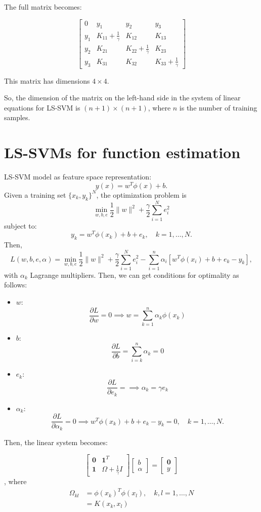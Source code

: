 The full matrix becomes:

\[
\begin{bmatrix}
0 & y_1 & y_2 & y_3 \\
y_1 & K_{11} + \frac{1}{\gamma} & K_{12} & K_{13} \\
y_2 & K_{21} & K_{22} + \frac{1}{\gamma} & K_{23} \\
y_3 & K_{31} & K_{32} & K_{33} + \frac{1}{\gamma}
\end{bmatrix}
\]

This matrix has dimensions \( 4 \times 4 \).

So, the dimension of the matrix on the left-hand side in the system of linear equations for LS-SVM is \( (n + 1) \times (n + 1) \), where \( n \) is the number of training samples.

\section{LS-SVMs for function estimation}
LS-SVM model as feature space representation:
$$y(x) = w^T\phi(x)+b.$$
Given a training set $\{x_k, y_k\}^N$, the optimization problem is 
\[
\min_{w, b, e} \frac{1}{2} \|w\|^2 + \frac{\gamma}{2} \sum_{i=1}^N e_i^2
\]
subject to:
\[
y_k = w^T \phi(x_k) + b + e_k, \quad k = 1,\dots, N. \]
Then, 
\[
L(w, b, e, \alpha) = \min_{w, b, e} \frac{1}{2} \|w\|^2 + \frac{\gamma}{2} \sum_{i=1}^N e_i^2 - \sum_{i=1}^n \alpha_i \left[ w^T \phi(x_i) + b + e_k - y_k \right],
\]
with $\alpha_k$ Lagrange multipliers. Then, we can get conditions for optimality as follows:

\begin{itemize}
	\item \( w \): \[
   \frac{\partial L}{\partial w} = 0 \implies w = \sum_{k=1}^n \alpha_k \phi(x_k)
   \]
	\item \( b \):
   \[
   \frac{\partial L}{\partial b} = \sum_{i=k}^n \alpha_k = 0
   \]
\item \( e_k \):
   \[
   \frac{\partial L}{\partial e_k} = \implies \alpha_k = \gamma e_k
   \]
\item \( \alpha_k \):
   \[
   \frac{\partial L}{\partial \alpha_k} = 0  \implies  w^T \phi(x_k) + b + e_k- y_k =0, \quad k=1,\dots, N.
   \]
\end{itemize}

Then, the linear system becomes:

\[
\begin{bmatrix}
\mathbf{0} & \mathbf{1}^T \\
\mathbf{1} & \Omega + \frac{1}{\gamma} I
\end{bmatrix}
\begin{bmatrix}
b \\
\alpha
\end{bmatrix}
=
\begin{bmatrix}
\mathbf{0} \\
y
\end{bmatrix}
\], 
where 
\begin{align*}
	\Omega_{kl}&= \phi(x_k)^T\phi(x_l), \quad k,l=1,\dots,N\\ 
			   &= K(x_k, x_l)
\end{align*}
